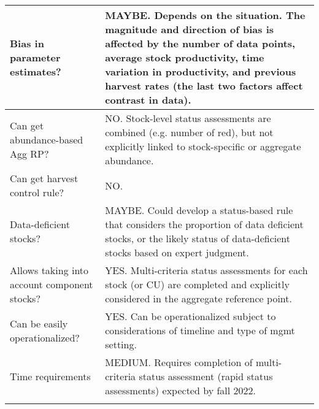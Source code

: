 \documentclass[french,11pt]{book}
\begin{document}
\begin{longtable}[t]{>{\raggedright\arraybackslash}p{9em}>{\raggedright\arraybackslash}p{37em}}
\midrule Bias in parameter estimates? & MAYBE.  Depends on the situation. The magnitude and direction of bias is affected by the number of data points, average stock productivity, time variation in productivity, and previous harvest rates (the last two factors affect contrast in data).\\
\midrule Can get abundance-based Agg RP? & NO.  Stock-level status assessments are combined (e.g. number of red), but not explicitly linked to stock-specific or aggregate abundance.\\
\midrule Can get harvest control rule? & NO.\\
\midrule Data-deficient stocks? & MAYBE. Could develop a status-based rule that considers the proportion of data deficient stocks, or the likely status of data-deficient stocks based on expert judgment.\\
\midrule Allows taking into account component stocks? & YES.  Multi-criteria status assessments for each stock (or CU) are completed and explicitly considered in the aggregate reference point.\\
\midrule Can be easily operationalized? & YES. Can be operationalized subject to considerations of timeline and type of mgmt setting.\\
\midrule Time requirements & MEDIUM. Requires completion of multi-criteria status assessment (rapid status assessments) expected by fall 2022.\\* \end{longtable}

\endgroup{} \endgroup{}

\clearpage
\end{document}
